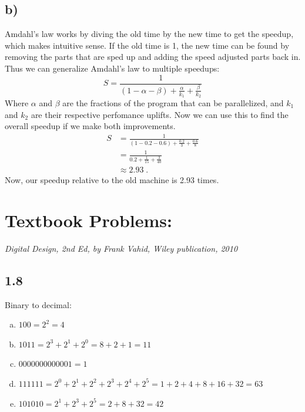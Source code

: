 \documentclass{article}
\begin{document}
\subsection*{b)}
Amdahl's law works by diving the old time by the new time to get the speedup, which makes intuitive sense.
If the old time is 1, the new time can be found by removing the parts that are sped up and adding the speed adjusted parts back in.
Thus we can generalize Amdahl's law to multiple speedups:
$$ S = \frac{1}{(1 - \alpha - \beta) + \frac{\alpha}{k_1} + \frac{\beta}{k_2}} $$
Where $\alpha$ and $\beta$ are the fractions of the program that can be parallelized, and $k_1$ and $k_2$ are their respective perfomance uplifts.
Now we can use this to find the overall speedup if we make both improvements.
\begin{align*}
    S &= \frac{1}{(1 - 0.2 - 0.6) + \frac{0.2}{3} + \frac{0.6}{8}} \\
    &= \frac{1}{0.2 + \frac{1}{15} + \frac{3}{40}} \\
    &\approx 2.93 \; .
\end{align*}
Now, our speedup relative to the old machine is 2.93 times.

\newpage
\section*{Textbook Problems:}
\textit{Digital Design, 2nd Ed, by Frank Vahid, Wiley publication, 2010}

\subsection*{1.8}
Binary to decimal:
\begin{enumerate}[(a)]
    \item $100 = 2^2 = 4$
    \item $1011 = 2^3 + 2^1 + 2^0 = 8 + 2 + 1 = 11$
    \item $0000000000001 = 1$
    \item $111111 = 2^0 + 2^1 + 2^2 + 2^3 + 2^4 + 2^5 = 1 + 2 + 4 + 8 + 16 + 32 = 63$
    \item $101010 = 2^1 + 2^3 + 2^5 = 2 + 8 + 32 = 42$
\end{enumerate}
\end{document}

